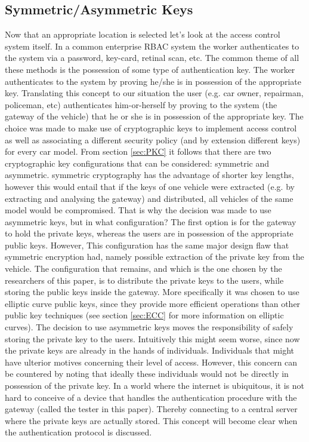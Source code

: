 \documentclass[master=cws,masteroption=vs,english]{kulemt}
\begin{document}
\subsection{Symmetric/Asymmetric Keys} 
\label{sec:symmetric/asymmetric_keys}

Now that an appropriate location is selected let's look at the access control system itself. In a common enterprise RBAC system the worker authenticates to the system via a password, key-card, retinal scan, etc. The common theme of all these methods is the possession of some type of authentication key. The worker authenticates to the system by proving he/she is in possession of the appropriate key. Translating this concept to our situation the user (e.g. car owner, repairman, policeman, etc) authenticates him-or-herself by proving to the system (the gateway of the vehicle) that he or she is in possession of the appropriate key. The choice was made to make use of cryptographic keys to implement access control as well as associating a different security policy (and by extension different keys) for every car model. From section \ref{sec:PKC} it follows that there are two cryptographic key configurations that can be considered: symmetric and asymmetric. symmetric cryptography has the advantage of shorter key lengths, however this would entail that if the keys of one vehicle were extracted (e.g. by extracting and analysing the gateway) and distributed, all vehicles of the same model would be compromised. That is why the decision was made to use asymmetric keys, but in what configuration? The first option is for the gateway to hold the private keys, whereas the users are in possession of the appropriate public keys. However, This configuration has the same major design flaw that symmetric encryption had, namely possible extraction of the private key from the vehicle. The configuration that remains, and which is the one chosen by the researchers of this paper, is to distribute the private keys to the users, while storing the public keys inside the gateway. More specifically it was chosen to use elliptic curve public keys, since they provide more efficient operations than other public key techniques (see section \ref{sec:ECC} for more information on elliptic curves). The decision to use asymmetric keys moves the responsibility of safely storing the private key to the users. Intuitively this might seem worse, since now the private keys are already in the hands of individuals. Individuals that might have ulterior motives concerning their level of access. However, this concern can be countered by noting that ideally these individuals would not be directly in possession of the private key. In a world where the internet is ubiquitous, it is not hard to conceive of a device that handles the authentication procedure with the gateway (called the tester in this paper). Thereby connecting to a central server where the private keys are actually stored. This concept will become clear when the authentication protocol is discussed.
\end{document}
